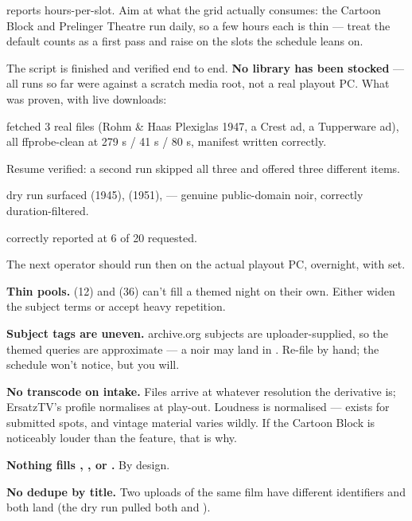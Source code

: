 \documentclass[fontpath=fonts/,logopath=logo/]{riposte-doc}
\begin{document}
 reports hours-per-slot. Aim at what the grid actually consumes: the Cartoon Block and Prelinger Theatre run daily, so a few hours each is thin — treat the default counts as a first pass and raise  on the slots the schedule leans on.



The script is finished and verified end to end. \textbf{No library has been stocked} — all runs so far were against a scratch media root, not a real playout PC. What was proven, with live downloads:

\begin{ripbullets}
\item {} fetched 3 real files (Rohm \& Haas Plexiglas 1947, a Crest ad, a Tupperware ad), all ffprobe-clean at 279 s / 41 s / 80 s, manifest written correctly.
\item Resume verified: a second run skipped all three and offered three different items.
\item {} dry run surfaced  (1945),  (1951),  — genuine public-domain noir, correctly duration-filtered.
\item {} correctly reported  at 6 of 20 requested.
\end{ripbullets}

The next operator should run  then  on the actual playout PC, overnight, with  set.



\begin{ripbullets}
\item \textbf{Thin pools.}  (12) and  (36) can't fill a themed night on their own. Either widen the subject terms or accept heavy repetition.
\item \textbf{Subject tags are uneven.} archive.org subjects are uploader-supplied, so the themed queries are approximate — a noir may land in . Re-file by hand; the schedule won't notice, but you will.
\item \textbf{No transcode on intake.} Files arrive at whatever resolution the derivative is; ErsatzTV's  profile normalises at play-out. Loudness is  normalised —  exists for submitted spots, and vintage material varies wildly. If the Cartoon Block is noticeably louder than the feature, that is why.
\item \textbf{Nothing fills , , or .} By design.
\item \textbf{No dedupe by title.} Two uploads of the same film have different identifiers and both land (the  dry run pulled both  and ).
\end{ripbullets}
\end{document}
